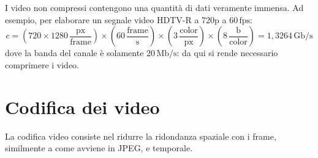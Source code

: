 I video non compressi contengono una quantità di dati veramente immensa. Ad esempio, per elaborare un segnale video HDTV-R a 720p a $60 \, \text{fps}$:
\begin{equation*}
    c = \left(720 \times 1280 \, \frac{\text{px}}{\text{frame}}\right) \times \left(60 \, \frac{\text{frame}}{\text{s}}\right) \times
    \left(3 \,  \frac{\text{color}}{\text{px}}\right) \times \left(8 \,  \frac{\text{b}}{\text{color}}\right) =
    1,3264 \, \text{Gb/s}
\end{equation*}
dove la banda del canale è solamente $20 \, \text{Mb/s}$: da qui si rende necessario comprimere i video.
\section{Codifica dei video}
La codifica video consiste nel ridurre la ridondanza spaziale con i frame, similmente a come avviene in JPEG, e temporale.
